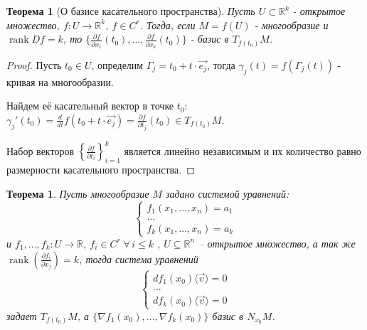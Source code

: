 \documentclass[a5paper]{article}
\newcounter{through}
\theoremstyle{plain}
\newtheorem{theorem}[through]{Теорема}
\theoremstyle{definition}
\numberwithin{through}{section}
\numberwithin{equation}{section}
\DeclareMathOperator{\rank}{rank}
\begin{document}
\begin{theorem}[О базисе касательного пространства]
	Пусть $U \subset \mathbb{R}^k$ - открытое множество, $f : U \to \mathbb{R}^k$, $f \in C^r$. Тогда, если $M = f(U)$ - многообразие и $\rank Df = k$, то $\{\frac{\partial f}{\partial x_1} (t_0), \ldots, \frac{\partial f}{\partial x_k} (t_0) \}$ - базис в $T_{f(t_0)}M$.
\end{theorem}

\begin{proof}
	Пусть $t_0 \in U$, определим $\Gamma_j = t_0 + t \cdot \vec{e_j}$, тогда 
	$\gamma_j(t)=f(\Gamma_j(t))$ - кривая на многообразии.
	
	Найдем её касательный вектор в точке $t_0$: $\gamma_j'(t_0) = 
	\frac{d}{dt} f(t_0 + t \cdot \vec{e_j}) = \frac{\partial f}{\partial t_j}(t_0) \in T_{f(t_0)}M$.
	
	Набор векторов $\left\{\frac{\partial f}{\partial t_i}\right\}_{i=1}^{k}$ является линейно независимым и их количество равно размерности касательного пространства.
\end{proof}

\begin{theorem}
	Пусть многообразие $M$ задано системой уравнений:
	\begin{equation*}
	\begin{cases}
	f_1(x_1, \ldots, x_n) = a_1
	\\
	\ldots
	\\
	f_k(x_1, \ldots, x_n) = a_k
	\end{cases}
	\end{equation*}
	и $f_1, \ldots, f_k : U \to \mathbb{R}$, $f_i \in C^r \; \forall \, i \leq k$ , $U \subseteq \mathbb{R}^n$ -- открытое множество, а так же $\rank (\frac{\partial f_i}{\partial x_j})=k$, тогда система уравнений
	\begin{equation*}
	\begin{cases}
	df_1(x_0)\langle\vec{v}\rangle = 0
	\\
	\ldots
	\\
	df_k(x_0)\langle\vec{v}\rangle = 0
	\end{cases}
	\end{equation*}
	задает $T_{f(t_0)}M$, а $\{\nabla f_1(x_0), \ldots, \nabla f_k(x_0)\}$ базис в $N_{x_0}M$.
\end{theorem}
\end{document}
